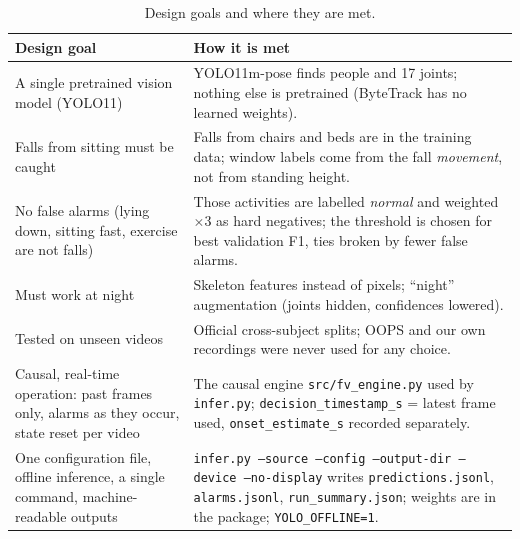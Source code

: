 \documentclass[11pt,a4paper]{article}
\newcommand{\code}[1]{\texttt{\small #1}}
\begin{document}
\begin{table}[H]\centering\small
\begin{tabularx}{\textwidth}{@{}>{\raggedright\arraybackslash}p{4.6cm}X@{}}\toprule
\textbf{Design goal} & \textbf{How it is met} \\ \midrule
A single pretrained vision model (YOLO11) & YOLO11m-pose finds people and 17 joints; nothing else is pretrained (ByteTrack has no learned weights). \\
Falls from sitting must be caught & Falls from chairs and beds are in the training data; window labels come from the fall \emph{movement}, not from standing height. \\
No false alarms (lying down, sitting fast, exercise are not falls) & Those activities are labelled \emph{normal} and weighted $\times 3$ as hard negatives; the threshold is chosen for best validation F1, ties broken by fewer false alarms. \\
Must work at night & Skeleton features instead of pixels; ``night'' augmentation (joints hidden, confidences lowered). \\
Tested on unseen videos & Official cross-subject splits; OOPS and our own recordings were never used for any choice. \\
Causal, real-time operation: past frames only, alarms as they occur, state reset per video & The causal engine \code{src/fv\_engine.py} used by \code{infer.py}; \code{decision\_timestamp\_s} = latest frame used, \code{onset\_estimate\_s} recorded separately. \\
One configuration file, offline inference, a single command, machine-readable outputs & \code{infer.py --source --config --output-dir --device --no-display} writes \code{predictions.jsonl}, \code{alarms.jsonl}, \code{run\_summary.json}; weights are in the package; \code{YOLO\_OFFLINE=1}. \\
\bottomrule\end{tabularx}
\caption{Design goals and where they are met.}\label{tab:req}
\end{table}
\end{document}
